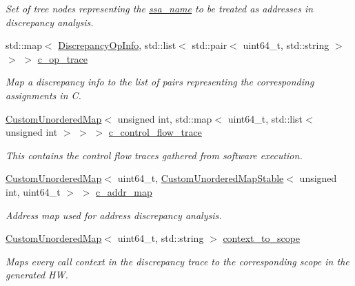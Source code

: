 \begin{DoxyCompactItemize}
\begin{DoxyCompactList}\small\item\em Set of tree nodes representing the \hyperlink{structssa__name}{ssa\+\_\+name} to be treated as addresses in discrepancy analysis. \end{DoxyCompactList}\item 
std\+::map$<$ \hyperlink{classDiscrepancyOpInfo}{Discrepancy\+Op\+Info}, std\+::list$<$ std\+::pair$<$ uint64\+\_\+t, std\+::string $>$ $>$ $>$ \hyperlink{structDiscrepancy_a9906d402084177f51a92df1731fa25ce}{c\+\_\+op\+\_\+trace}
\begin{DoxyCompactList}\small\item\em Map a discrepancy info to the list of pairs representing the corresponding assignments in C. \end{DoxyCompactList}\item 
\hyperlink{custom__map_8hpp_ad1ed68f2ff093683ab1a33522b144adc}{Custom\+Unordered\+Map}$<$ unsigned int, std\+::map$<$ uint64\+\_\+t, std\+::list$<$ unsigned int $>$ $>$ $>$ \hyperlink{structDiscrepancy_aba40ab7fce0dd3b52d3c2a7261ec7c29}{c\+\_\+control\+\_\+flow\+\_\+trace}
\begin{DoxyCompactList}\small\item\em This contains the control flow traces gathered from software execution. \end{DoxyCompactList}\item 
\hyperlink{custom__map_8hpp_ad1ed68f2ff093683ab1a33522b144adc}{Custom\+Unordered\+Map}$<$ uint64\+\_\+t, \hyperlink{custom__map_8hpp_a7314a7df1cdb3a3acf478ab86e95c226}{Custom\+Unordered\+Map\+Stable}$<$ unsigned int, uint64\+\_\+t $>$ $>$ \hyperlink{structDiscrepancy_a225dda03d26685febf8c24f7fd77e420}{c\+\_\+addr\+\_\+map}
\begin{DoxyCompactList}\small\item\em Address map used for address discrepancy analysis. \end{DoxyCompactList}\item 
\hyperlink{custom__map_8hpp_ad1ed68f2ff093683ab1a33522b144adc}{Custom\+Unordered\+Map}$<$ uint64\+\_\+t, std\+::string $>$ \hyperlink{structDiscrepancy_a0deb6094e1991bebff7fd36ef2704458}{context\+\_\+to\+\_\+scope}
\begin{DoxyCompactList}\small\item\em Maps every call context in the discrepancy trace to the corresponding scope in the generated HW. \end{DoxyCompactList}\item 

\end{DoxyCompactItemize}
